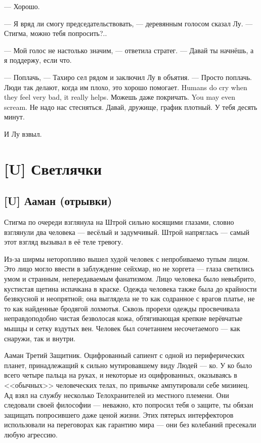 --- Хорошо.

--- Я вряд ли смогу председательствовать, --- деревянным голосом сказал Лу.
--- Стигма, можно тебя попросить?..

--- Мой голос не настолько значим, --- ответила стратег.
--- Давай ты начнёшь, а я поддержу, если что.

--- Поплачь, --- Тахиро сел рядом и заключил Лу в объятия.
--- Просто поплачь.
{Люди так делают, когда им плохо, это хорошо помогает.}
{Humans do cry when they feel very bad, it really helps.}
{Можешь даже покричать.}
{You may even scream.}
Не надо нас стесняться.
Давай, дружище, график плотный.
У тебя десять минут.

И Лу взвыл.

\chapter{[U] Светлячки}

\section{[U] Ааман (отрывки)}

Стигма по очереди взглянула на Штрой сильно косящими глазами, словно взглянули два человека --- весёлый и задумчивый.
Штрой напряглась --- самый этот взгляд вызывал в её теле тревогу.

Из-за ширмы неторопливо вышел худой человек с непробиваемо тупым лицом.
Это лицо могло ввести в заблуждение сейхмар, но не хоргета --- глаза светились умом и странным, непередаваемым фанатизмом.
Лицо человека было невыбрито, кустистая щетина испачкана в краске.
Одежда человека также была до крайности безвкусной и неопрятной;
она выглядела не то как содранное с врагов платье, не то как найденные бродягой лохмотья.
Сквозь прорехи одежды просвечивала неправдоподобно чистая безволосая кожа, обтягивающая крепкие верёвчатые мышцы и сетку вздутых вен.
Человек был сочетанием несочетаемого --- как снаружи, так и внутри.

Ааман Третий Защитник.
Оцифрованный сапиент с одной из периферических планет, принадлежащий к сильно мутировавшему виду Людей --- ко. %
У ко было всего четыре пальца на руках, и некоторые из оцифрованных, оказываясь в <<обычных>> человеческих телах, по привычке ампутировали себе мизинец.
Ад взял на службу несколько Телохранителей из местного племени.
Они следовали своей философии --- неважно, кто попросил тебя о защите, ты обязан защищать попросившего даже ценой жизни.
Этих пятерых интерфекторов использовали на переговорах как гарантию мира --- они без колебаний пресекали любую агрессию.

